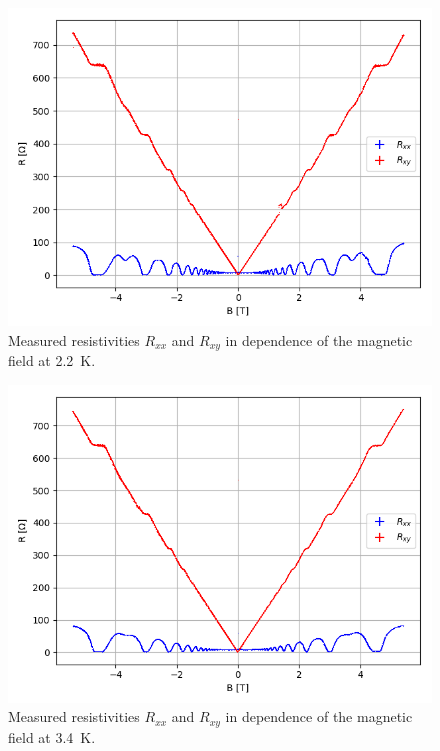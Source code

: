 \documentclass[12pt,a4paper]{article}
\begin{document}
\begin{figure} [H]
\centering
\includegraphics[scale=0.8]{Bilder/Elektron_g/2_2/Rohdaten.PNG}
\caption{Measured resistivities $R_{xx}$ and $R_{xy}$ in dependence of the magnetic field at \SI{2.2}{K}.}
\end{figure}

\begin{figure} [H]
\centering
\includegraphics[scale=0.8]{Bilder/Elektron_g/3_6/Rohdaten.PNG}
\caption{Measured resistivities $R_{xx}$ and $R_{xy}$ in dependence of the magnetic field at \SI{3.4}{K}.}
\end{figure}
\end{document}
